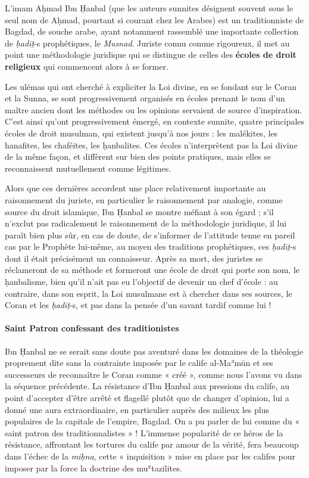 L'imam Aḥmad Ibn Ḥanbal (que les auteurs sunnites désignent souvent sous
le seul nom de Aḥmad, pourtant si courant chez les Arabes) est un
traditionniste de Bagdad, de souche arabe, ayant notamment rassemblé une
importante collection de \emph{ḥadīṯ}-s prophétiques, le \emph{Musnad}.
Juriste connu comme rigoureux, il met au point une méthodologie
juridique qui se distingue de celles des \textbf{écoles de droit
religieux} qui commencent alors à se former.
\begin{Def}
 Les ulémas qui ont cherché à expliciter la Loi divine, en se fondant sur le Coran et la Sunna, se sont progressivement organisés en écoles prenant le nom d’un maître ancien dont les méthodes ou les opinions servaient de source d’inspiration. C’est ainsi qu’ont progressivement émergé, en contexte sunnite, quatre principales écoles de droit musulman, qui existent jusqu’à nos jours : les malékites, les hanafites, les chaféites, les ḥanbalites. Ces écoles n’interprètent pas la Loi divine de la même façon, et diffèrent sur bien des points pratiques, mais elles se reconnaissent mutuellement comme légitimes. 
\end{Def}
Alors que ces dernières
accordent une place relativement importante au raisonnement du juriste,
en particulier le raisonnement par analogie, comme source du droit
islamique, Ibn Ḥanbal se montre méfiant à son égard ; s'il n'exclut pas
radicalement le raisonnement de la méthodologie juridique, il lui paraît
bien plus sûr, en cas de doute, de s'informer de l'attitude tenue en
pareil cas par le Prophète lui-même, au moyen des traditions
prophétiques, ces \emph{ḥadīṯ}-s dont il était précisément un
connaisseur. Après sa mort, des juristes se réclameront de sa méthode et
formeront une école de droit qui porte son nom, le ḥanbalisme, bien
qu'il n'ait pas eu l'objectif de devenir un chef d'école : au contraire,
dans son esprit, la Loi musulmane est à chercher dans ses sources, le
Coran et les \emph{ḥadīṯ}-s, et pas dans la pensée d'un savant tardif
comme lui !

\paragraph{Saint Patron confessant des traditionistes} Ibn Ḥanbal ne se serait sans doute pas aventuré dans les domaines de la
théologie proprement dite sans la contrainte imposée par le calife
al-Maʾmūn et ses successeurs de reconnaître le Coran comme « créé »,
comme nous l'avons vu dans la séquence précédente. La résistance d'Ibn
Ḥanbal aux pressions du calife, au point d'accepter d'être arrêté et
flagellé plutôt que de changer d'opinion, lui a donné une aura
extraordinaire, en particulier auprès des milieux les plus populaires de
la capitale de l'empire, Bagdad. On a pu parler de lui comme du « saint
patron des traditionnalistes » ! L'immense popularité de ce héros de la
résistance, affrontant les tortures du calife par amour de la vérité,
fera beaucoup dans l'échec de la \emph{miḥna}, cette « inquisition »
mise en place par les califes pour imposer par la force la doctrine des
muʿtazilites.

